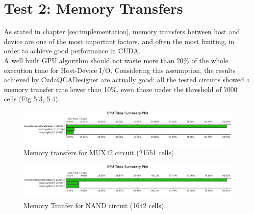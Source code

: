 \section{Test 2: Memory Transfers}
As stated in chapter \ref{sec:implementation}, memory transfers between host and device are one of the most important factors, and often the most limiting, in order to achieve good performance in CUDA.\\
A well built GPU algorithm should not waste more than 20\% of the whole execution time for Host-Device I/O. Considering this assumption, the results achieved by CudaQCADesigner are actually good: all the tested circuits showed a memory transfer rate lower than 10\%, even those under the threshold of 7000 cells (Fig 5.3, 5.4).

\begin{figure}[h!bt]
        \centerline{\includegraphics[width=\textwidth]{img/GPUTimeSummaryPlotMUX42.png}}
        \caption{Memory transfers for MUX42 circuit (21551 cells).}
        \label{fig:OccupancyAnalysis}
\end{figure}


\begin{figure}[h!bt]
        \centerline{\includegraphics[width=\textwidth]{img/GPUTimeSummaryPlotNAND.png}}
        \caption{Memory Tranfer for NAND circuit (1642 cells).}
        \label{fig:OccupancyAnalysis}
\end{figure}
   
